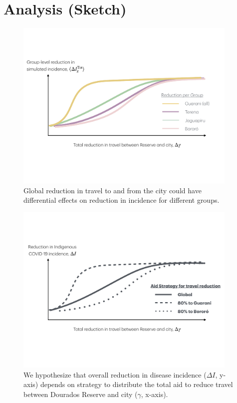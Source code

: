 \documentclass[
  letterpaper,
  abstract]{scrartcl}
\begin{document}
\section{Analysis (Sketch)}\label{analysis-sketch}

\begin{figure}[H]

{\centering \includegraphics[width=0.95\textwidth,height=\textheight]{Figures/ResultsSketch_ReductionByGroup.pdf}

}

\caption{Global reduction in travel to and from the city could have
differential effects on reduction in incidence for different groups.}

\end{figure}%


\begin{figure}[H]

{\centering \includegraphics[width=0.95\textwidth,height=\textheight]{Figures/ResultsSketch_ByStrategy.pdf}

}

\caption{We hypothesize that overall reduction in disease incidence ($\Delta I$, y-axis)  depends on 
strategy to distribute the total aid to reduce travel between Dourados Reserve and city ($\gamma$, x-axis).}

\end{figure}%
\end{document}

